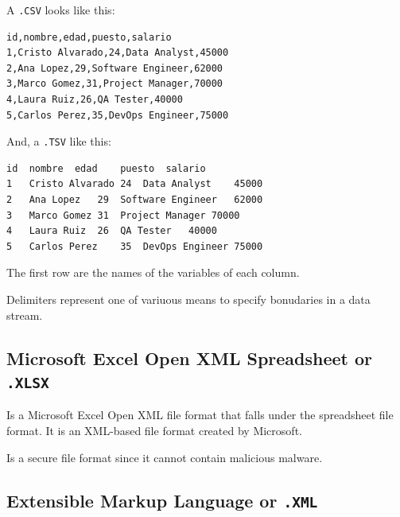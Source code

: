 \documentclass[../../ibm_data_analysis.tex]{subfiles}
\begin{document}
    \begin{exa}
        A \lstinline|.CSV| looks like this:

        \begin{lstlisting}[caption={\lstinline|.CSV| File Content Example.},label=figure:CSV_example]
id,nombre,edad,puesto,salario
1,Cristo Alvarado,24,Data Analyst,45000
2,Ana Lopez,29,Software Engineer,62000
3,Marco Gomez,31,Project Manager,70000
4,Laura Ruiz,26,QA Tester,40000
5,Carlos Perez,35,DevOps Engineer,75000
        \end{lstlisting}

        And, a \lstinline|.TSV| like this:

        \begin{lstlisting}[caption={\lstinline|.TSV| File Content Example.},label=figure:TSV_example]
id	nombre	edad	puesto	salario
1	Cristo Alvarado	24	Data Analyst	45000
2	Ana Lopez	29	Software Engineer	62000
3	Marco Gomez	31	Project Manager	70000
4	Laura Ruiz	26	QA Tester	40000
5	Carlos Perez	35	DevOps Engineer	75000
        \end{lstlisting}

    \end{exa}

    The first row are the names of the variables of each column.

    \begin{obs}
        Delimiters represent one of variuous means to specify bonudaries in a data stream.
    \end{obs}

    \subsection{Microsoft Excel Open XML Spreadsheet or \lstinline|.XLSX|}

    Is a Microsoft Excel Open XML file format that falls under the spreadsheet file format. It is an XML-based file format created by Microsoft.

    Is a secure file format since it cannot contain malicious malware.

    \subsection{Extensible Markup Language or \lstinline|.XML|}
\end{document}
